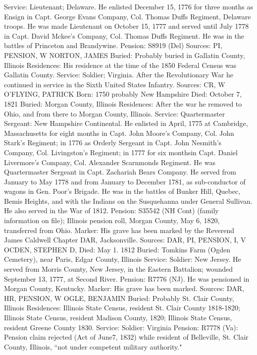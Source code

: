 Service: Lieutenant; Delaware. He enlisted December 15, 1776 for three months as Ensign in Capt. George Evans Company, Col. Thomas Duffs Regiment, Delaware troops. He was made Lieutenant on October 15, 1777 and served until July 1778 in Capt. David Mckee's Company, Col. Thomas Duffs Regiment. He was in the battles of Princeton and Brandywine. 
Pension: S8919 (Del)
Sources: PI, PENSION, W 
NORTON, JAMES 
Buried: Probably buried in Gallatin County, Illinois
Residences: His residence at the time of the 1850 Federal Census was Gallatin County.
Service: Soldier; Virginia. After the Revolutionary War he continued in service in the Sixth United States Infantry.
Sources: CR, W 
O'FLYING, PATRICK 
Born: 1750 probably New Hampshire
Died: October 7, 1821 
Buried: Morgan County, Illinois 
Residences: After the war he removed to Ohio, and from there to Morgan County, Illinois. 
Service: Quartermaster Sergeant: New Hampshire Continental. He enlisted in April, 1775 at Cambridge, Massachusetts for eight months in Capt. John Moore's Company, Col. John Stark's Regiment; in 1776 as Orderly Sergeant in Capt. John Nesmith's Company, Col. Livingston's Regiment; in 1777 for six monthsin Capt. Daniel Livermore's Company, Col. Alexander Scarnmonds Regiment. He was Quartermaster Sergeant in Capt. Zachariah Bears Com­pany. He served from January to May 1778 and from January to December 1781, as sub-conductor of wagons in Gen. Poor's Brigade. He was in the battles of Bunker Hill, Quebec, Bemis Heights, and with the Indians on the Susquehanna under General Sullivan. He also served in the War of 1812. 
Pension: S35542 (NH Cont) (family information on file); Illinois pension roll, Morgan County, May 6, 1820, transferred from Ohio. 
Marker: His grave has been marked by the Reverend James Caldwell Chapter DAR, Jacksonville. 
Sources: DAR, PI, PENSION, I, V 
OCDEN, STEPHEN D, 
Died: May 1. 1812 
Buried: Tomkins Farm (Ogden Cemetery), near Paris, Edgar County, Illinois 
Service: Soldier: New Jersey. He served from Morris County, New Jersey, in the Eastern Battalion; wounded September 13, 1777, at Second River. 
Pension: R7776 (NJ). He was pensioned in Morgan County, Kentucky. 
Marker: His grave has been marked. 
Sources: DAR, HR, PENSION, W 
OGLE, BENJAMIN 
Buried: Probably St. Clair County, Illinois 
Residences: Illinois State Census, resident St. Clair County 1818-1820; Illinois State Census, resident Madison County, 1820; Illinois State Census, resident Greene County 1830. 
Service: Soldier: Virginia 
Pension: R7778 (Va): Pension claim rejected (Act of June7, 1832) while resident of Belleville, St. Clair County, Illinois, “not under competent military author­ity." 
